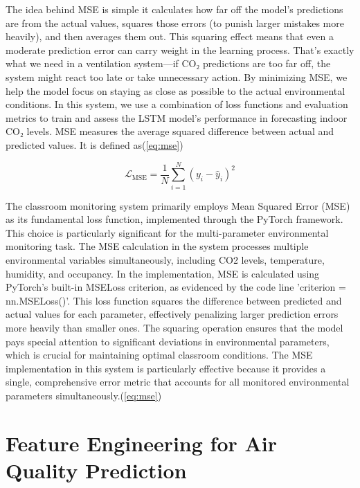 The idea behind MSE is simple it calculates how far off the model’s predictions are from the actual values, squares those errors (to punish larger mistakes more heavily), and then averages them out. This squaring effect means that even a moderate prediction error can carry weight in the learning process. That’s exactly what we need in a ventilation system—if CO₂ predictions are too far off, the system might react too late or take unnecessary action. By minimizing MSE, we help the model focus on staying as close as possible to the actual environmental conditions. In this system, we use a combination of loss functions and evaluation metrics to train and assess the LSTM model's performance in forecasting indoor CO₂ levels. MSE measures the average squared difference between actual and predicted values. It is defined as(\ref{eq:mse})


\begin{equation}
\mathcal{L}_{\text{MSE}} = \frac{1}{N} \sum_{i=1}^{N} (y_i - \hat{y}_i)^2
\label{eq:mse} 
\end{equation}

The classroom monitoring system primarily employs Mean Squared Error (MSE) as its fundamental loss function, implemented through the PyTorch framework. This choice is particularly significant for the multi-parameter environmental monitoring task. The MSE calculation in the system processes multiple environmental variables simultaneously, including CO2 levels, temperature, humidity, and occupancy. In the implementation, MSE is calculated using PyTorch's built-in MSELoss criterion, as evidenced by the code line 'criterion = nn.MSELoss()'. This loss function squares the difference between predicted and actual values for each parameter, effectively penalizing larger prediction errors more heavily than smaller ones. The squaring operation ensures that the model pays special attention to significant deviations in environmental parameters, which is crucial for maintaining optimal classroom conditions. The MSE implementation in this system is particularly effective because it provides a single, comprehensive error metric that accounts for all monitored environmental parameters simultaneously.(\ref{eq:mse})







\section{Feature Engineering for Air Quality Prediction}

